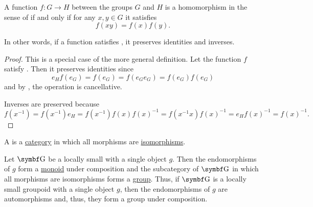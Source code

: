 \begin{proposition}\label{thm:group_homomorphism_single_condition}
  A function \( f: G \to H \) between the groups \( G \) and \( H \) is a homomorphism in the sense of  if and only if for any \( x, y \in G \) it satisfies
  \begin{equation}\label{thm:group_homomorphism_single_condition/condition}
    f(xy) = f(x) f(y).
  \end{equation}

  In other words, if a function satisfies , it preserves identities and inverses.
\end{proposition}
\begin{proof}
  \Sufficiency This is a special case of the more general definition.
  \Necessity Let the function \( f \) satisfy . Then it preserves identities since
  \begin{equation*}
    e_H f(e_G) = f(e_G) = f(e_G e_G) = f(e_G) f(e_G)
  \end{equation*}
  and by , the operation is cancellative.

  Inverses are preserved because
  \begin{equation*}
    f(x^{-1})
    =
    f(x^{-1}) e_H
    =
    f(x^{-1}) f(x) f(x)^{-1}
    =
    f(x^{-1} x) f(x)^{-1}
    =
    e_H f(x)^{-1}
    =
    f(x)^{-1}.
  \end{equation*}
\end{proof}

\begin{definition}\label{def:groupoid}
  A  is a \hyperref[def:category]{category} in which all morphisms are \hyperref[def:morphism_invertibility]{isomorphisms}.
\end{definition}

\begin{definition}\label{remark:groupoids}
  Let \( \Bold G \) be a locally small with a single object \( g \). Then the endomorphisms of \( g \) form a \hyperref[def:magma]{monoid} under composition and the subcategory of \( \Bold G \) in which all morphisms are isomorphisms forms a \hyperref[def:magma]{group}. Thus, if \( \Bold G \) is a locally small groupoid with a single object \( g \), then the endomorphisms of \( g \) are automorphisms and, thus, they form a group under composition.
\end{definition}


